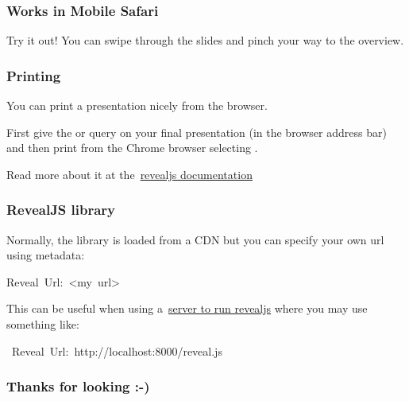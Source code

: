 \documentclass[xcolor=table]{beamer}
\begin{document}
\begin{mdframe}%

\frametitle{Works in Mobile Safari}\label{heading-sec-works-in-mobile-safari}%

\noindent{}Try it out! You can swipe through the slides and pinch your way to the
overview.%
\end{mdframe}\label{sec-works-in-mobile-safari}%

\begin{mdframe}%

\frametitle{Printing}\label{heading-sec-printing}%

\noindent{}You can print a  presentation nicely from the browser.%

First give the  or  query on your final
presentation (in the browser address bar) and then print from the Chrome
browser selecting .%

Read more about it at the~\href{https://github.com/hakimel/reveal.js\%23pdf-export}{revealjs documentation}%
\end{mdframe}\label{sec-printing}%

\begin{mdframe}%

\frametitle{RevealJS library}\label{heading-sec-revealjs-library}%

\noindent{}Normally, the  library is loaded from a CDN but you can specify your
own url using metadata:%
\begin{mdpre}%
\noindent Reveal~Url:~\textless{}my~url\textgreater{}%
\end{mdpre}\noindent{}This can be useful when using a~\href{https://github.com/hakimel/reveal.js\%23full-setup}{server to run revealjs}
where you may use something like:
\begin{mdpre}%
\noindent@nopreview~Reveal~Url:~http://localhost:8000/reveal.js%
\end{mdpre}%
\end{mdframe}\label{sec-revealjs-library}%

\begin{mdframe}%

\frametitle{Thanks for looking :-)}\label{heading-sec-thanks-for-looking---}%
\end{mdframe}\label{sec-thanks-for-looking---}%
\end{document}
